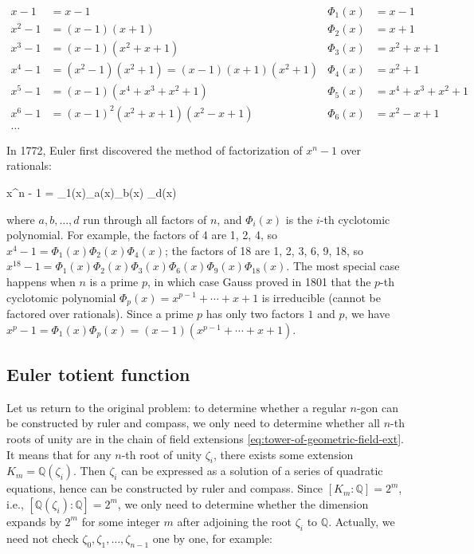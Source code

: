 \begin{align*}
x - 1 &= x - 1 & \Phi_1(x) &= x - 1 \\
x^2 - 1 &= (x - 1)(x + 1) & \Phi_2(x) &= x + 1 \\
x^3 - 1 &= (x - 1)(x^2 + x + 1) & \Phi_3(x) &= x^2 + x + 1 \\
x^4 - 1 &= (x^2 - 1)(x^2 + 1) = (x - 1)(x + 1)(x^2 + 1) & \Phi_4(x) &= x^2 + 1 \\
x^5 - 1 &= (x - 1)(x^4 + x^3 + x^2 + 1) & \Phi_5(x) &= x^4 + x^3 + x^2 + 1 \\
x^6 - 1 &= (x - 1)^2(x^2 + x + 1)(x^2 - x + 1) & \Phi_6(x) &= x^2 - x + 1 \\
\dotso
\end{align*}

In 1772, Euler first discovered the method of factorization of $x^n - 1$ over rationals\cite{LinKailiang-2025}:

\be
x^n - 1 = \Phi_1(x)\Phi_a(x)\Phi_b(x) \dotsm \Phi_d(x)
\ee

where $a, b, \dotsc, d$ run through all factors of $n$, and $\Phi_i(x)$ is the $i$-th cyclotomic polynomial. For example, the factors of 4 are 1, 2, 4, so $x^4 - 1 = \Phi_1(x)\Phi_2(x)\Phi_4(x)$; the factors of 18 are 1, 2, 3, 6, 9, 18, so $x^{18} - 1 = \Phi_1(x)\Phi_2(x)\Phi_3(x)\Phi_6(x)\Phi_9(x)\Phi_{18}(x)$. The most special case happens when $n$ is a prime $p$, in which case Gauss proved in 1801 that the $p$-th cyclotomic polynomial $\Phi_p(x) = x^{p-1} + \dotsb + x + 1$ is irreducible (cannot be factored over rationals). Since a prime $p$ has only two factors $1$ and $p$, we have $x^p - 1 = \Phi_1(x)\Phi_p(x) = (x - 1)(x^{p-1} + \dotsb + x + 1)$.

\subsection{Euler totient function}
Let us return to the original problem: to determine whether a regular $n$-gon can be constructed by ruler and compass, we only need to determine whether all $n$-th roots of unity are in the chain of field extensions \cref{eq:tower-of-geometric-field-ext}. It means that for any $n$-th root of unity $\zeta_i$, there exists some extension $K_m = \mathbb{Q}(\zeta_i)$. Then $\zeta_i$ can be expressed as a solution of a series of quadratic equations, hence can be constructed by ruler and compass. Since $[K_m : \mathbb{Q}] = 2^m$, i.e., $[\mathbb{Q}(\zeta_i) : \mathbb{Q}] = 2^m$, we only need to determine whether the dimension expands by $2^m$ for some integer $m$ after adjoining the root $\zeta_i$ to $\mathbb{Q}$. Actually, we need not check $\zeta_0, \zeta_1, \dotsc, \zeta_{n-1}$ one by one, for example:

